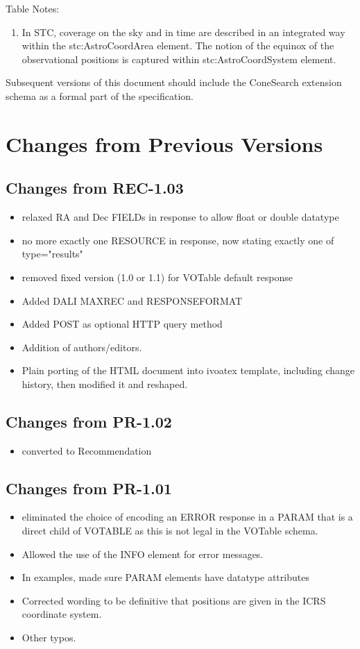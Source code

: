 \documentclass[11pt,a4paper]{ivoa}
\begin{document}
Table Notes:
\begin{enumerate}
	\item In STC, coverage on the sky and in time are described in an integrated way within the stc:AstroCoordArea element. The notion of the equinox of the observational positions is captured within stc:AstroCoordSystem element.
\end{enumerate}
Subsequent versions of this document should include the ConeSearch extension schema as a formal part of the specification.

\section{Changes from Previous Versions}
\label{app:changes}

\subsection{Changes from REC-1.03}
\begin{itemize}
	\item relaxed RA and Dec FIELDs in response to allow float or double datatype
	\item no more exactly one RESOURCE in response, now stating exactly one of type="results"
	\item removed fixed version (1.0 or 1.1) for VOTable default response
	\item Added DALI MAXREC and RESPONSEFORMAT
	\item Added POST as optional HTTP query method
	\item Addition of authors/editors.
	\item Plain porting of the HTML document into ivoatex template, including change history, then modified it and reshaped.
\end{itemize}

\subsection{Changes from PR-1.02}
\begin{itemize}
	\item converted to Recommendation
\end{itemize}

\subsection{Changes from PR-1.01}
\begin{itemize}
	\item eliminated the choice of encoding an ERROR response in a PARAM that is a direct child of VOTABLE as this is not legal in the VOTable schema.
	\item Allowed the use of the INFO element for error messages.
	\item In examples, made sure PARAM elements have datatype attributes
	\item Corrected wording to be definitive that positions are given in the ICRS coordinate system.
	\item Other typos.
\end{itemize}
\end{document}
